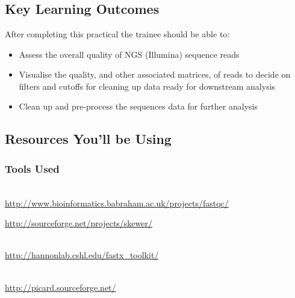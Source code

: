 
\chapter{\moduleTitle}
\newpage

\section{Key Learning Outcomes}

After completing this practical the trainee should be able to:
\begin{itemize}
  \item Assess the overall quality of NGS (Illumina) sequence reads
  \item Visualise the quality, and other associated matrices, of reads to decide
        on filters and cutoffs for cleaning up data ready for downstream analysis
  \item Clean up and pre-process the sequences data for further analysis
\end{itemize}

\section{Resources You'll be Using}
 
\subsection{Tools Used}
\begin{description}[style=multiline,labelindent=0cm,align=left,leftmargin=0.5cm]
  \item[FastQC]\hfill\\
  	\url{http://www.bioinformatics.babraham.ac.uk/projects/fastqc/}
   \item[Skewer]
   	\url{http://sourceforge.net/projects/skewer/}
  \item[FASTX-Toolkit]\hfill\\
 	\url{http://hannonlab.cshl.edu/fastx_toolkit/}
  \item[Picard]\hfill\\
  	\url{http://picard.sourceforge.net/}
\end{description}

